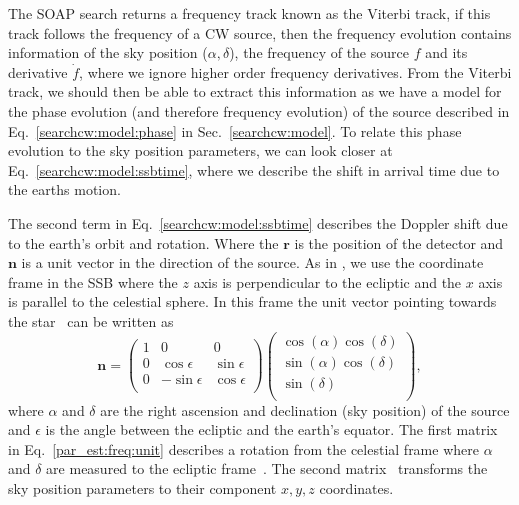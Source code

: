 The SOAP search returns a frequency track known as the Viterbi track, if this
track follows the frequency of a \gls{CW} source, then the frequency evolution
contains information of the sky position ($\alpha, \delta$), the frequency of
the source $f$ and its derivative $\dot{f}$, where we ignore higher order
frequency derivatives.  From the Viterbi track, we should then be able to
extract this information as we have a model for the phase evolution (and
therefore frequency evolution) of the source described in
Eq.~\ref{searchcw:model:phase} in Sec.~\ref{searchcw:model}.  To relate this
phase evolution to the sky position parameters, we can look closer at
Eq.~\ref{searchcw:model:ssbtime}, where we describe the shift in arrival time
due to the earths motion.~ 

The second term in Eq.~\ref{searchcw:model:ssbtime} describes the Doppler shift
due to the earth's orbit and rotation.  Where the $\bm{r}$ is the position of
the detector and $\bm{n}$ is a unit vector in the direction of the source.  As
in \citep{schutz1998DataAnalysis}, we use the coordinate frame in the \gls{SSB}
where the $z$ axis is perpendicular to the ecliptic and the $x$ axis is
parallel to the celestial sphere.  In this frame the unit vector pointing
towards the star~ can be written as
%
\begin{equation}
    \label{par_est:freq:unit}
    \bm{n} = 
    \left(
    \begin{matrix}
        1 & 0 & 0  \\
        0 & \cos \epsilon & \sin \epsilon \\
        0 & -\sin \epsilon & \cos \epsilon \\
    \end{matrix} \right)
    \left(
    \begin{matrix}
        \cos(\alpha)\cos(\delta)  \\
        \sin(\alpha)\cos(\delta) \\
        \sin(\delta) \\
    \end{matrix} \right),
\end{equation}
%
where $\alpha$ and $\delta$ are the right ascension and declination (sky
position) of the source and $\epsilon$ is the angle between the ecliptic and
the earth's equator.  The first matrix in Eq.~\ref{par_est:freq:unit} describes
a rotation from the celestial frame where $\alpha$ and $\delta$ are measured to
the ecliptic frame~.  The second matrix~ transforms the sky position parameters to their component
$x,y,z$ coordinates.

